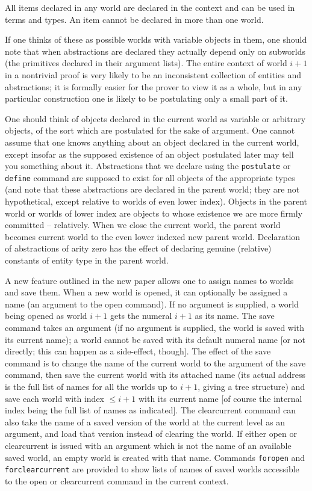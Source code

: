 All items declared in any world are declared in the context and can be used in terms and types.  An item cannot be declared in more than one world.  

If one thinks of these as possible worlds with variable objects in them, one should note that when abstractions are declared they actually depend only on subworlds (the primitives declared in their argument lists).   The entire context of world $i+1$ in a nontrivial proof is very likely to be an inconsistent collection of entities and abstractions; it is formally easier for the prover to
view it as a whole, but in any particular construction one is likely to be postulating only a small part of it.

One should think of objects declared in the current world as variable or arbitrary objects, of the sort which are postulated for the sake of argument.  One cannot assume that one knows anything about an object declared in the current world, except insofar as the supposed existence of an object postulated later may tell you something about it.   Abstractions that we declare using the {\tt postulate} or {\tt define} command are supposed to exist for all objects of the appropriate types (and note that these abstractions are declared in the parent world; they are not hypothetical, except relative to worlds of even lower index).   Objects in the parent world or worlds of lower index are objects to whose existence we are more firmly committed -- relatively.   When we close the current world, the parent world becomes current world to the even lower indexed new parent world.  Declaration of abstractions of arity zero has the effect of declaring genuine (relative) constants of entity type in the parent world.

A new feature outlined in the new paper allows one to assign names to worlds and save them.  When a new world is opened, it can optionally be assigned a name
(an argument to the open command).  If no argument is supplied, a world being opened as world $i+1$ gets the numeral $i+1$ as its name.  The save command takes an argument
(if no argument is supplied, the world is saved with its current name); a world cannot be saved with its default numeral name [or not directly; this can happen as a side-effect, though].
The effect of the save command is to change the name of the current world to the argument of the save command, then save the current world with its attached name (its actual address is the full list of names for all the worlds up to $i+1$, giving a tree structure) and save each world with index $\leq i+1$ with its current name [of course the internal index being the full list of names as indicated].  The clearcurrent command can also take the name of a saved version of the world at the current level as an argument, and load that version instead of clearing the world.  If either open or clearcurrent is issued with an argument which is not the name of an available saved world, an empty world is created with that name.  Commands {\tt foropen}
and {\tt forclearcurrent} are provided to show lists of names of saved worlds accessible to the open or clearcurrent command in the current context.

